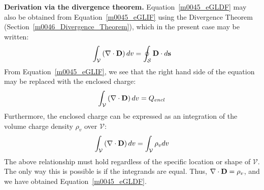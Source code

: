 {\bf Derivation via the divergence theorem.}
Equation~\ref{m0045_eGLDF} may also be obtained from Equation~\ref{m0045_eGLIF} using the Divergence Theorem (Section~\ref{m0046_Divergence_Theorem}), which in the present case may be written:
%
\begin{equation}
\int_{\mathcal V} \left( \nabla \cdot {\bf D} \right) dv = \oint_{\mathcal S} {\bf D}\cdot d{\bf s}
\end{equation}
%
From Equation~\ref{m0045_eGLIF}, we see that the right hand side of the equation may be replaced with the enclosed charge:
%
\begin{equation}
\int_{\mathcal V} \left( \nabla \cdot {\bf D} \right) dv = Q_{encl}
\end{equation}
%
Furthermore, the enclosed charge can be expressed as an integration of the volume charge density $\rho_v$ over ${\mathcal V}$:
%
\begin{equation}
\int_{\mathcal V} \left( \nabla \cdot {\bf D} \right) dv = \int_{\mathcal V}\rho_v dv
\end{equation}
%
The above relationship must hold regardless of the specific location or shape of ${\mathcal V}$.  The only way this is possible is if the integrands are equal.  Thus, $\nabla \cdot {\bf D}=\rho_v$, and we have obtained Equation~\ref{m0045_eGLDF}.

